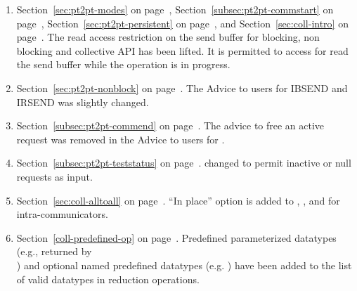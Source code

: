 \begin{enumerate}
\item
Section~\ref{sec:pt2pt-modes} on page~\pageref{sec:pt2pt-modes}, %
Section~\ref{subsec:pt2pt-commstart} on page~\pageref{subsec:pt2pt-commstart}, %
Section~\ref{sec:pt2pt-persistent} on page~\pageref{sec:pt2pt-persistent}, and %
Section~\ref{sec:coll-intro} on page~\pageref{sec:coll-intro}. %
\newline
The read access restriction on the send buffer for blocking, non blocking and collective API has been lifted. It is permitted to access for read the send buffer while the operation is in progress. 


\item
Section~\ref{sec:pt2pt-nonblock} on page~\pageref{sec:pt2pt-nonblock}. %
\newline
The Advice to users for IBSEND and IRSEND was slightly changed.

\item
Section~\ref{subsec:pt2pt-commend} on page~\pageref{subsec:pt2pt-commend}. %
\newline
The advice to free an active request was removed in the Advice to users for .

\item
Section~\ref{subsec:pt2pt-teststatus} on page~\pageref{subsec:pt2pt-teststatus}. %
\newline
{} changed to permit inactive or null requests as input.

\item
Section~\ref{sec:coll-alltoall} on page~\pageref{sec:coll-alltoall}. %
\newline
``In place'' option is added to , , and  for intra-communicators.

\item
Section~\ref{coll-predefined-op} on page~\pageref{coll-predefined-op}. %
\newline
Predefined parameterized datatypes (e.g., returned by\\) and optional named predefined datatypes (e.g. ) have been added to the list of valid datatypes in reduction operations.


\end{enumerate}
